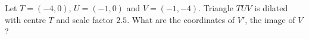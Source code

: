 Let $T=(-4,0)$, $U=(-1,0)$ and $V=(-1,-4)$. Triangle $TUV$ is dilated with centre $T$ and scale factor $2.5$. What are the coordinates of $V'$, the image of $V$?
